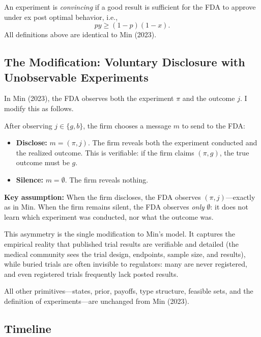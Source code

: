 \documentclass[12pt,a4paper]{article}
\begin{document}
An experiment is \emph{convincing} if a good result is
sufficient for the FDA to approve under ex post optimal
behavior, i.e.,
\begin{equation}\label{eq:convincing}
  py \geq (1 - p)(1 - x).
\end{equation}
All definitions above are identical to Min (2023).


\subsection{The Modification: Voluntary Disclosure with
  Unobservable Experiments}
\label{sec:modification}

In Min (2023), the FDA observes both the experiment $\pi$ and
the outcome $j$. I modify this as follows.

After observing $j \in \{g, b\}$, the firm chooses a message
$m$ to send to the FDA:
\begin{itemize}
  \item \textbf{Disclose:} $m = (\pi, j)$. The firm reveals
    both the experiment conducted and the realized outcome.
    This is verifiable: if the firm claims $(\pi, g)$, the true
    outcome must be $g$.
  \item \textbf{Silence:} $m = \emptyset$. The firm reveals
    nothing.
\end{itemize}

\medskip
\noindent\textbf{Key assumption:} When the firm discloses, the
FDA observes $(\pi, j)$---exactly as in Min. When the firm
remains silent, the FDA observes \emph{only} $\emptyset$: it
does not learn which experiment was conducted, nor what the
outcome was.

\medskip
This asymmetry is the single modification to Min's model. It
captures the empirical reality that published trial results are
verifiable and detailed (the medical community sees the trial
design, endpoints, sample size, and results), while buried
trials are often invisible to regulators: many are never
registered, and even registered trials frequently lack posted
results.

All other primitives---states, prior, payoffs, type structure,
feasible sets, and the definition of experiments---are
unchanged from Min (2023).


\subsection{Timeline}
\label{sec:timeline}
\end{document}
